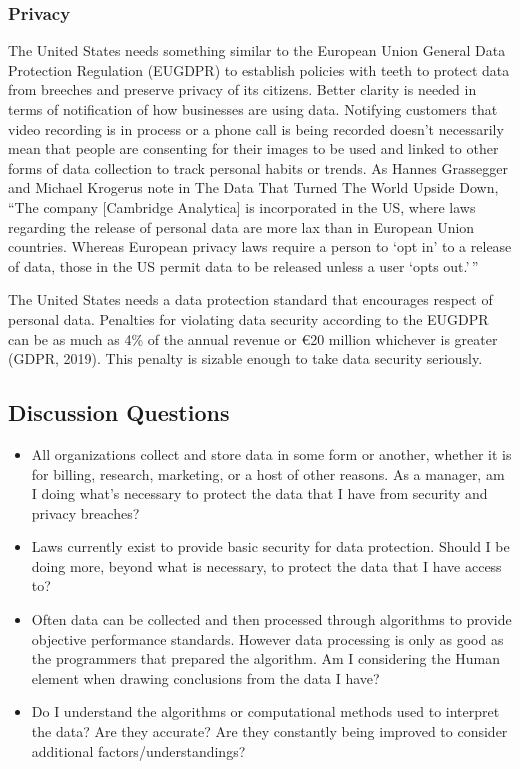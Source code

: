 \documentclass[]{book}
\begin{document}
\hypertarget{privacy}{%
\subsubsection{Privacy}\label{privacy}}

The United States needs something similar to the European Union General Data Protection Regulation (EUGDPR) to establish policies with teeth to protect data from breeches and preserve privacy of its citizens. Better clarity is needed in terms of notification of how businesses are using data. Notifying customers that video recording is in process or a phone call is being recorded doesn't necessarily mean that people are consenting for their images to be used and linked to other forms of data collection to track personal habits or trends. As Hannes Grassegger and Michael Krogerus note in The Data That Turned The World Upside Down, ``The company {[}Cambridge Analytica{]} is incorporated in the US, where laws regarding the release of personal data are more lax than in European Union countries. Whereas European privacy laws require a person to `opt in' to a release of data, those in the US permit data to be released unless a user `opts out.'\,''

The United States needs a data protection standard that encourages respect of personal data. Penalties for violating data security according to the EUGDPR can be as much as 4\% of the annual revenue or €20 million whichever is greater (GDPR, 2019). This penalty is sizable enough to take data security seriously.

\hypertarget{discussion-questions-3}{%
\subsection{Discussion Questions}\label{discussion-questions-3}}

\begin{itemize}
\item
  All organizations collect and store data in some form or another, whether it is for billing, research, marketing, or a host of other reasons. As a manager, am I doing what's necessary to protect the data that I have from security and privacy breaches?
\item
  Laws currently exist to provide basic security for data protection. Should I be doing more, beyond what is necessary, to protect the data that I have access to?
\item
  Often data can be collected and then processed through algorithms to provide objective performance standards. However data processing is only as good as the programmers that prepared the algorithm. Am I considering the Human element when drawing conclusions from the data I have?
\item
  Do I understand the algorithms or computational methods used to interpret the data? Are they accurate? Are they constantly being improved to consider additional factors/understandings?
\end{itemize}
\end{document}
